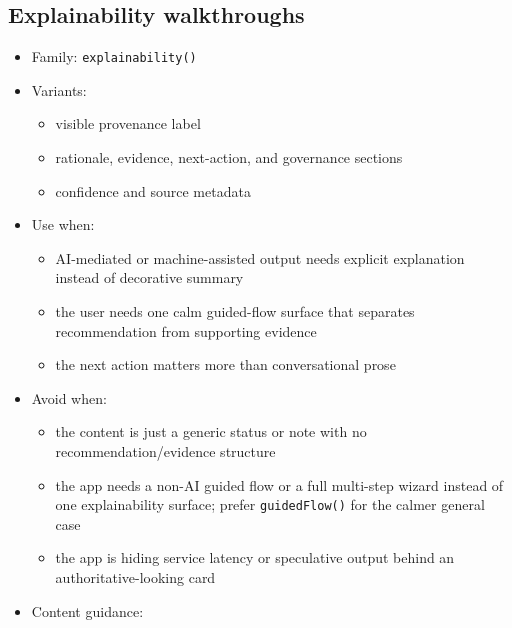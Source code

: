 \subsection{Explainability walkthroughs}\label{record-019-explainability-walkthroughs}

\begin{itemize}
\tightlist
\item
  Family: \texttt{e\allowbreak{}x\allowbreak{}p\allowbreak{}l\allowbreak{}a\allowbreak{}i\allowbreak{}n\allowbreak{}a\allowbreak{}b\allowbreak{}i\allowbreak{}l\allowbreak{}i\allowbreak{}t\allowbreak{}y\allowbreak{}(\allowbreak{})}
\item
  Variants:

  \begin{itemize}
  \tightlist
  \item
    visible provenance label
  \item
    rationale, evidence, next-action, and governance sections
  \item
    confidence and source metadata
  \end{itemize}
\item
  Use when:

  \begin{itemize}
  \tightlist
  \item
    AI-mediated or machine-assisted output needs explicit explanation instead of decorative summary
  \item
    the user needs one calm guided-flow surface that separates recommendation from supporting evidence
  \item
    the next action matters more than conversational prose
  \end{itemize}
\item
  Avoid when:

  \begin{itemize}
  \tightlist
  \item
    the content is just a generic status or note with no recommendation/evidence structure
  \item
    the app needs a non-AI guided flow or a full multi-step wizard instead of one explainability surface; prefer \texttt{g\allowbreak{}u\allowbreak{}i\allowbreak{}d\allowbreak{}e\allowbreak{}d\allowbreak{}F\allowbreak{}l\allowbreak{}o\allowbreak{}w\allowbreak{}(\allowbreak{})} for the calmer general case
  \item
    the app is hiding service latency or speculative output behind an authoritative-looking card
  \end{itemize}
\item
  Content guidance:


\end{itemize}
